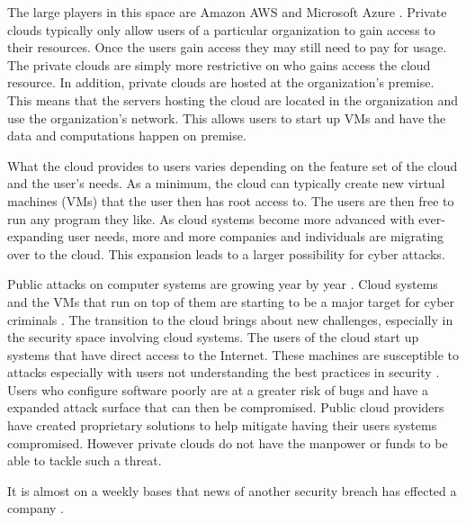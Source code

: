 \documentclass[12pt]{article}
\begin{document}
The large players in this space are Amazon AWS \cite{amazonAWS} and Microsoft Azure \cite{Azure2017}. Private clouds typically only allow users of a particular organization to gain access to their resources. Once the users gain access they may still need to pay for usage. The private clouds are simply more restrictive on who gains access the cloud resource. In addition, private clouds are hosted at the organization's premise.  This means that the servers hosting the cloud are located in the organization and use the organization's network. This allows users to start up VMs and have the data and computations happen on premise.

What the cloud provides to users varies depending on the feature set of the cloud and the user's needs. As a minimum, the cloud can typically create new virtual machines (VMs) that the user then has root access to. The users are then free to run any program they like. As cloud systems become more advanced with ever-expanding user needs, more and more companies and individuals are migrating over to the cloud\cite{kondo2009cost}. This expansion leads to a larger possibility for cyber attacks.

Public attacks on computer systems are growing year by year \cite{newman_2017}. Cloud systems and the VMs that run on top of them are starting to be a major target for cyber criminals \cite{kellerman}. The transition to the cloud brings about new challenges, especially in the security space involving cloud systems. The users of the cloud start up systems that have direct access to the Internet. These machines are susceptible to attacks especially with users not understanding the best practices in security \cite{ng2009studying}. Users who configure software poorly are at a greater risk of bugs and have a expanded attack surface that can then be compromised.  Public cloud providers have created proprietary solutions to help mitigate having their users systems compromised. However private clouds do not have the manpower or funds to be able to tackle such a threat.

\iffalse
It is almost on a weekly bases that news of another security breach has effected a company \cite{newman_2017}.
\end{document}
